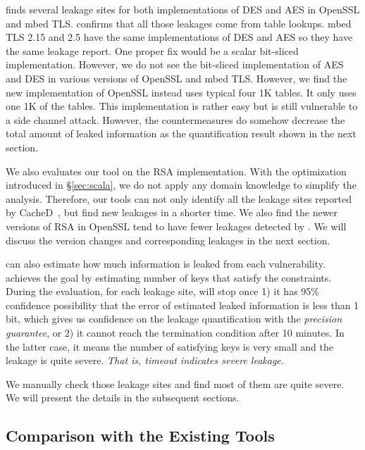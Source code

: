 \tool{} finds several leakage sites for both implementations of DES and AES in
OpenSSL and mbed TLS\@. \tool{} confirms that all those leakages come from table
lookups. mbed TLS 2.15 and 2.5 have the same implementations of DES and AES so
they have the same leakage report. One proper fix would be a scalar bit-sliced
implementation. However, we do not see the bit-sliced implementation of AES and
DES in various versions of OpenSSL and mbed TLS\@. However, we find the new
implementation of OpenSSL instead uses typical four 1K tables. It only uses one 1K
of the tables. This implementation is rather easy but is still vulnerable to a
side channel attack. However, the countermeasures do somehow decrease the total
amount of leaked information as the quantification result shown in the next
section.

We also evaluates our tool on the RSA implementation. With the optimization
introduced in \S\ref{sec:scala}, we do not apply any domain knowledge to
simplify the analysis. Therefore, our tools can not only identify all the leakage sites
reported by CacheD~\cite{203878}, but find new leakages in a shorter time. 
We also find the newer
versions of RSA in OpenSSL tend to have fewer leakages detected by \tool{}. We
will discuss the version changes and corresponding leakages in the next section.

\tool{} can also estimate how
much information is leaked from each vulnerability. \tool{} achieves the goal by
estimating number of keys that satisfy the constraints. During the evaluation,
for each leakage site, \tool{} will stop once 1) it has 95\% confidence
possibility that the error of estimated leaked information is less than 1 bit,
which gives us confidence on the leakage quantification with the \emph{precision guarantee}, 
or 2) it cannot reach the termination condition after 10 minutes. In
the latter case, it means the number of satisfying keys is very small and the
leakage is quite severe. \emph{That is, timeout indicates severe leakage.}
\label{loc:timeout}


We manually check those leakage sites and find most of them are quite severe.
We will present the details in the subsequent sections.

\subsection{Comparison with the Existing Tools}
\label{eval:scala}

